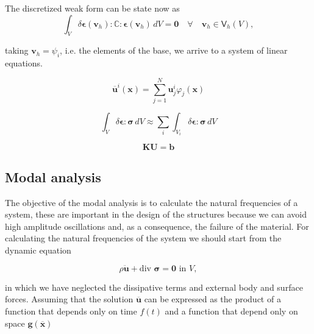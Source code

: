 \documentclass[review]{elsarticle}
\begin{document}

The discretized weak form can be state now as
\begin{equation}
\int_V \delta \bm{\epsilon}(\bm{v}_h) : \mathbb{C} : \bm{\epsilon}(\bm{v}_h) \,dV = \bm{0}
\quad \forall \quad \bm{v}_h \in \bm{\mathsf{V}}_h(V),
\end{equation}

\noindent
taking $\bm{v}_h = \psi_i$, i.e. the elements of the base, we
arrive to a system of linear equations.

\begin{equation}
\overline{\bm{u}}^i(\bm{x}) = 
\sum_{j=1}^N \bm{u}_j^i \varphi_j (\bm{x})
\end{equation}

\begin{equation}
\int_V \delta \bm{\epsilon}:\bm{\sigma} \,dV
\approx
\sum_i \int_{V_i} \delta \bm{\epsilon}:\bm{\sigma} \,dV
\end{equation}

\begin{equation}
\bm{K}\bm{U} = \bm{b}
\label{eq:equil_matricial}
\end{equation}


\subsection{Modal analysis}

The objective of the modal analysis is to calculate the natural frequencies
of a system, these are important in the design of the structures because we can avoid 
high amplitude oscillations and, as a consequence, the failure of the material. 
For calculating the natural frequencies of the system we should start from the
dynamic equation  

\begin{equation}
\rho \ddot{\bm{u}} + \text{div } \bm{\sigma} = \bm{0} \text{ in } V,
\label{eq:motion}
\end{equation}

\noindent
in which we have neglected the dissipative terms and external body and surface
forces.
Assuming that the solution $\overline{\bm{u}}$ can be expressed as the
product of a function that depends only on time $f(t)$ and a function that
depend only on space $\bm{g}(\overline{\bm{x}})$ 
\end{document}
